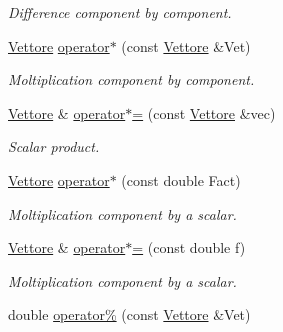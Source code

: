 \begin{DoxyCompactItemize}
\begin{DoxyCompactList}\small\item\em \-Difference component by component. \end{DoxyCompactList}\item 
\hypertarget{classVettore_a00320cfea95d8047e4da795752c6fa86}{\hyperlink{classVettore}{\-Vettore} \hyperlink{classVettore_a00320cfea95d8047e4da795752c6fa86}{operator$\ast$} (const \hyperlink{classVettore}{\-Vettore} \&\-Vet)}\label{classVettore_a00320cfea95d8047e4da795752c6fa86}

\begin{DoxyCompactList}\small\item\em \-Moltiplication component by component. \end{DoxyCompactList}\item 
\hypertarget{classVettore_a77cef992de9faca80d4793e49fbca308}{\hyperlink{classVettore}{\-Vettore} \& \hyperlink{classVettore_a77cef992de9faca80d4793e49fbca308}{operator$\ast$=} (const \hyperlink{classVettore}{\-Vettore} \&vec)}\label{classVettore_a77cef992de9faca80d4793e49fbca308}

\begin{DoxyCompactList}\small\item\em \-Scalar product. \end{DoxyCompactList}\item 
\hypertarget{classVettore_abfb6a64e5e1a2d892a7ec95aeaf87a50}{\hyperlink{classVettore}{\-Vettore} \hyperlink{classVettore_abfb6a64e5e1a2d892a7ec95aeaf87a50}{operator$\ast$} (const double \-Fact)}\label{classVettore_abfb6a64e5e1a2d892a7ec95aeaf87a50}

\begin{DoxyCompactList}\small\item\em \-Moltiplication component by a scalar. \end{DoxyCompactList}\item 
\hypertarget{classVettore_a7f8dc90bb200d3eddb0e06df2bed55ac}{\hyperlink{classVettore}{\-Vettore} \& \hyperlink{classVettore_a7f8dc90bb200d3eddb0e06df2bed55ac}{operator$\ast$=} (const double f)}\label{classVettore_a7f8dc90bb200d3eddb0e06df2bed55ac}

\begin{DoxyCompactList}\small\item\em \-Moltiplication component by a scalar. \end{DoxyCompactList}\item 
\hypertarget{classVettore_ac3246db90b8c4d550de3eab05f179509}{double \hyperlink{classVettore_ac3246db90b8c4d550de3eab05f179509}{operator\%} (const \hyperlink{classVettore}{\-Vettore} \&\-Vet)}\label{classVettore_ac3246db90b8c4d550de3eab05f179509}


\end{DoxyCompactItemize}
